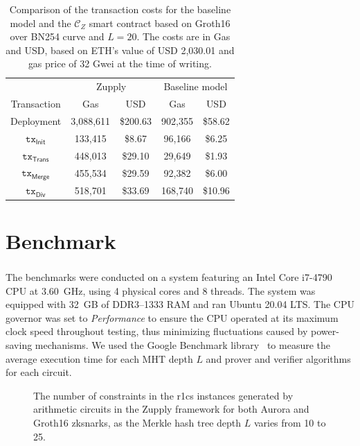 \begin{table}[t] %
	\caption[The cost of transactions in the Zupply framework]{Comparison of the transaction costs for the baseline model and the $\mathcal{C}_Z$ smart contract based on Groth16 over BN254 curve and $L=20$. The costs are in Gas and USD, based on ETH's value of USD 2,030.01 and gas price of 32 Gwei at the time of writing.}
	\centering
{
	\begin{tabular}{ccccc}
		\toprule
        & \multicolumn{2}{c}{Zupply} & \multicolumn{2}{c}{Baseline model}\\ %
		{Transaction} & {Gas} & {USD} & {Gas} & {USD}\\
		\midrule
		Deployment & 3,088,611 & \$200.63 & 902,355 & \$58.62 \\ %
		$\texttt{tx}_{\textsf{Init}}$ & 133,415 & \$8.67 & 96,166 & \$6.25 \\ %
		$\texttt{tx}_{\textsf{Trans}}$ & 448,013 & \$29.10 & 29,649 & \$1.93\\ %
		$\texttt{tx}_{\textsf{Merge}}$ & 455,534 & \$29.59 & 92,382 & \$6.00 \\ %
		$\texttt{tx}_{\textsf{Div}}$ & 518,701 & \$33.69 & 168,740 & \$10.96\\ %
		\bottomrule
	\end{tabular}
 }
	\label{tab:transaction_gas}
\end{table}


\section{Benchmark}
\label{sec:zupply-benchmark}
The benchmarks were conducted on a system featuring an Intel\textsuperscript{\textregistered} Core\texttrademark{} i7-4790 CPU at 3.60~GHz, using 4 physical cores and 8 threads. The system was equipped with 32~GB of DDR3–1333 RAM and ran Ubuntu 20.04 LTS. The CPU governor was set to \textit{Performance} to ensure the CPU operated at its maximum clock speed throughout testing, thus minimizing fluctuations caused by power-saving mechanisms. We used the Google Benchmark library~\cite{google_benchmark} to measure the average execution time for each \textsf{MHT} depth \( L \) and prover and verifier algorithms for each circuit.

\begin{figure}
    \centering
    \scalebox{.81}{
    
    }
    \caption[Number of constraints in the R1CS instances in Zupply]{The number of constraints in the \gls{r1cs} instances generated by arithmetic circuits in the Zupply framework for both Aurora \cite{Aurora2019} and Groth16 \cite{Groth2016} \glspl{zksnark}, as the Merkle hash tree depth \(L\) varies from 10 to 25.}
    \label{fig:num_constraints}
\end{figure}

